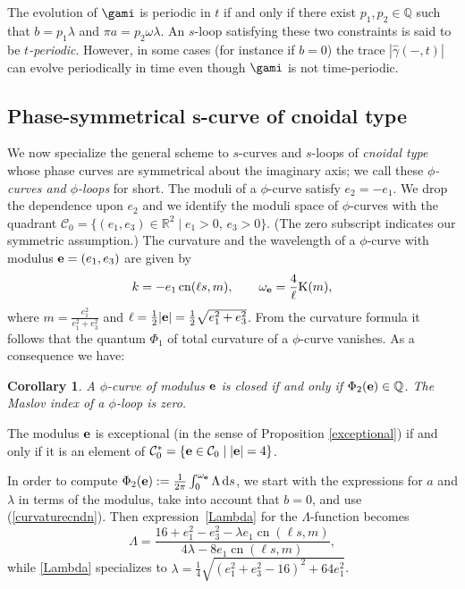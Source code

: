 \documentclass[10pt,a4paper]{amsart}
\newcommand\kk{k} %
\def\gam{\gamma} %
\def\R{\mathbb R}
\newcommand\be{{\bf e}}
\newcommand\gamf{\widehat{\gam}} %
\newcommand\cn{\operatorname{cn}}
\numberwithin{equation}{section}
\newtheorem{Corollary}[Theorem]{Corollary}
\begin{document}
\begin{Remark} \label{timeevolution2} The evolution of $\gami$ is periodic in $t$ if and only if there exist $p_1,p_2\in {\mathbb Q}$ such that $b=p_1\lambda$ and
 $\pi a= p_2\omega\lambda$. An $s$-loop satisfying these two constraints is said to be {\it $t$-periodic}. However, in some cases (for instance if $b=0$) the trace $|\gamf(-,t)|$ can evolve periodically in time even though $\gami$ is not time-periodic.
\end{Remark}

\subsection[Phase-symmetrical s-curve of cnoidal type]{Phase-symmetrical $\boldsymbol{s}$-curve of cnoidal type}

We now specialize the general scheme to $s$-curves and $s$-loops of \emph{cnoidal type} whose phase curves are symmetrical about the imaginary axis; we call these {\it $\phi$-curves and $\phi$-loops} for short.
The moduli of a $\phi$-curve satisfy
$e_2=-e_1$. We drop the dependence upon $e_2$ and we identify the moduli space
of $\phi$-curves with the quadrant
${\mathcal C}_0=\bigl\{(e_1,e_3)\in \R^2 \mid e_1>0, \, e_3>0\bigr\}$.
(The zero subscript indicates our symmetric assumption.)
The curvature and the wavelength of a $\phi$-curve with modulus $\be=(e_1,e_3)$ are given by
\begin{equation}\label{curvaturecndn}
\kk =
-e_1\cn(\ell s,m),\qquad
\omega_\be=
\frac{4}{\ell}{\rm K}(m),
\end{equation}
where $m=\frac{e_1^2}{e_1^2+e_3^2}$ and $\ell = \frac12 |\be|=\frac12 \sqrt{e_1^2 + e_3^2}$.
From the curvature formula it follows that the quantum $\Phi_1$ of total curvature of a $\phi$-curve vanishes. As a consequence we have:

\begin{Corollary} A $\phi$-curve of modulus $\be$ is closed if and only if $\Phi_2(\be)\in {\mathbb Q}$. The Maslov index of a $\phi$-loop is zero.
\end{Corollary}

\begin{Remark} The modulus $\be$ is exceptional (in the sense of Proposition \ref{exceptional}) if and only if it is an element of ${\mathcal C}^{*}_0=\{\be\in {\mathcal C}_0 \mid |\be|=4\}$.
\end{Remark}

In order to compute $\Phi_2(\be):=\frac{1}{2\pi}\int_0^{\omega_\be} \Lambda \, {\rm d}s$, we start with the expressions for $a$ and $\lambda$ in terms of the modulus, take into account that $b=0$, and use (\ref{curvaturecndn}). Then expression~\eqref{Lambda} for the $\Lambda$-function becomes
\begin{equation}\label{Lambda2} \Lambda = \dfrac{ 16+e_1^2-e_3^2 -\lambda e_1 \cn(\ell s, m)}{4\lambda - 8 e_1 \cn(\ell s, m)},
\end{equation}
while \eqref{Lambda} specializes to $\lambda = \tfrac14 \sqrt{(e_1^2+e_3^2-16)^2 + 64 e_1^2}$.
\end{document}
